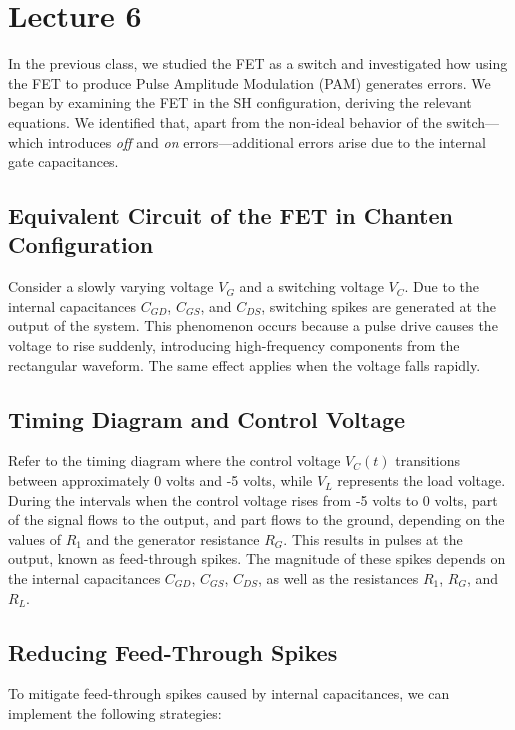 \newpage
\section{Lecture 6}

In the previous class, we studied the FET as a switch and investigated how using the FET to produce Pulse Amplitude Modulation (PAM) generates errors. We began by examining the FET in the SH configuration, deriving the relevant equations. We identified that, apart from the non-ideal behavior of the switch—which introduces \textit{off} and \textit{on} errors—additional errors arise due to the internal gate capacitances.

\subsection{Equivalent Circuit of the FET in Chanten Configuration}

Consider a slowly varying voltage \( V_G \) and a switching voltage \( V_C \). Due to the internal capacitances \( C_{GD} \), \( C_{GS} \), and \( C_{DS} \), switching spikes are generated at the output of the system. This phenomenon occurs because a pulse drive causes the voltage to rise suddenly, introducing high-frequency components from the rectangular waveform. The same effect applies when the voltage falls rapidly.

\subsection{Timing Diagram and Control Voltage}

Refer to the timing diagram where the control voltage \( V_C(t) \) transitions between approximately 0 volts and -5 volts, while \( V_L \) represents the load voltage. During the intervals when the control voltage rises from -5 volts to 0 volts, part of the signal flows to the output, and part flows to the ground, depending on the values of \( R_1 \) and the generator resistance \( R_G \). This results in pulses at the output, known as feed-through spikes. The magnitude of these spikes depends on the internal capacitances \( C_{GD} \), \( C_{GS} \), \( C_{DS} \), as well as the resistances \( R_1 \), \( R_G \), and \( R_L \).

\subsection{Reducing Feed-Through Spikes}

To mitigate feed-through spikes caused by internal capacitances, we can implement the following strategies:

